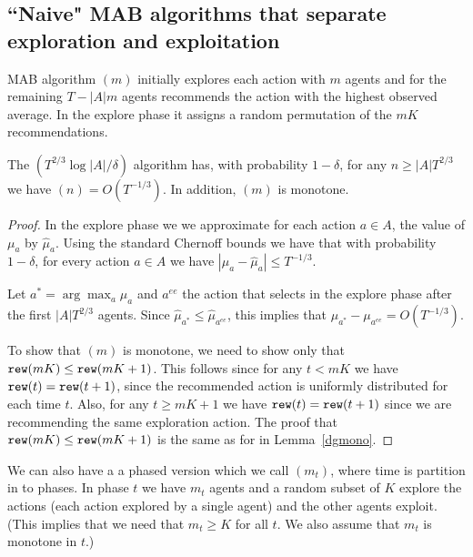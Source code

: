 
\subsection{``Naive" MAB algorithms that separate exploration and exploitation}
\label{sec:MAB-naive}



MAB algorithm \ExplorExploit$(m)$ initially explores each action
with $m$ agents and for the remaining $T-|A|m$ agents recommends the
action with the highest observed average. In the explore phase it
assigns a random permutation of the $mK$ recommendations.

\begin{lemma}
The \ExplorExploit$(T^{2/3}\log |A|/\delta)$ algorithm has, with
probability $1-\delta$, for any  $n\geq |A|T^{2/3}$ we have
\BIR$(n)=O(T^{-1/3})$. In addition, \ExplorExploit$(m)$ is monotone.
\end{lemma}

\begin{proof}
In the explore phase we we approximate for each action $a\in A$, the
value of $\mu_a$ by $\hat{\mu}_a$. Using the standard Chernoff
bounds we have that with probability $1-\delta$, for every action
$a\in A$ we have $|\mu_a -\hat{\mu}_a| \leq T^{-1/3}$.

Let $a^* = \arg\max_a \mu_a$ and $a^{ee}$ the action that
\ExplorExploit selects in the explore phase after the first
$|A|T^{2/3}$ agents. Since $\hat{\mu}_{a^*} \leq
\hat{\mu}_{a^{ee}}$, this implies that $\mu_{a^*} -
\mu_{a^{ee}}=O(T^{-1/3})$.

To show that \ExplorExploit$(m)$ is monotone, we need to show only
that $\mathtt{rew}(mK) \leq \mathtt{rew}(mK+1)$. This follows since for any $t< mK$
we have $\mathtt{rew}(t)=\mathtt{rew}(t+1)$, since the recommended action is
uniformly distributed for each time $t$. Also, for any $t\geq mK+1$
we have $\mathtt{rew}(t)=\mathtt{rew}(t+1)$ since we are recommending the same
exploration action. The proof that $\mathtt{rew}(mK) \leq \mathtt{rew}(mK+1)$ is the
same as for \DynGreedy in Lemma~\ref{dgmono}.
\end{proof}

We can also have a a phased version which we call
\PhasedExplorExploit$(m_t)$, where time is partition in to phases.
In phase $t$ we have $m_t$ agents and a random subset of $K$ explore
the actions (each action explored by a single agent) and the other
agents exploit. (This implies that we need that $m_t\geq K$ for all
$t$. We also assume that $m_t$ is monotone in $t$.)

